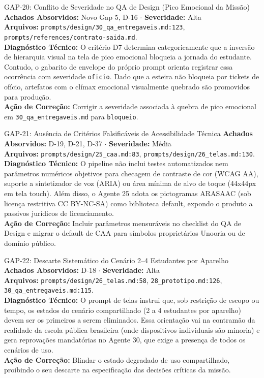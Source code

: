 \documentclass[11pt,a4paper]{article}
\begin{document}
\begin{gapbox}{GAP-20: Conflito de Severidade no QA de Design (Pico Emocional da Missão)}
\textbf{Achados Absorvidos:} Novo Gap 5, D-16 $\cdot$ \textbf{Severidade:} Alta\\
\textbf{Arquivos:} \texttt{prompts/design/30\_qa\_entregaveis.md:123}, \texttt{prompts/references/contrato-saida.md}.\\
\textbf{Diagnóstico Técnico:} O critério D7 determina categoricamente que a inversão de hierarquia visual na tela de pico emocional bloqueia a jornada do estudante. Contudo, o gabarito de envelope do próprio prompt orienta registrar essa ocorrência com severidade \texttt{oficio}. Dado que a esteira não bloqueia por tickets de ofício, artefatos com o clímax emocional visualmente quebrado são promovidos para produção.\\
\textbf{Ação de Correção:} Corrigir a severidade associada à quebra de pico emocional em \texttt{30\_qa\_entregaveis.md} para \texttt{bloqueio}.
\end{gapbox}

\begin{gapbox}{GAP-21: Ausência de Critérios Falsificáveis de Acessibilidade Técnica}
\textbf{Achados Absorvidos:} D-19, D-21, D-37 $\cdot$ \textbf{Severidade:} Média\\
\textbf{Arquivos:} \texttt{prompts/design/25\_caa.md:83}, \texttt{prompts/design/26\_telas.md:130}.\\
\textbf{Diagnóstico Técnico:} O pipeline não inclui testes automatizados nem parâmetros numéricos objetivos para checagem de contraste de cor (WCAG AA), suporte a sintetizador de voz (ARIA) ou área mínima de alvo de toque (44x44px em tela touch). Além disso, o Agente 25 adota os pictogramas ARASAAC (sob licença restritiva CC BY-NC-SA) como biblioteca default, expondo o produto a passivos jurídicos de licenciamento.\\
\textbf{Ação de Correção:} Incluir parâmetros mensuráveis no checklist do QA de Design e migrar o default de CAA para símbolos proprietários Unooria ou de domínio público.
\end{gapbox}

\begin{gapbox}{GAP-22: Descarte Sistemático do Cenário 2--4 Estudantes por Aparelho}
\textbf{Achados Absorvidos:} D-18 $\cdot$ \textbf{Severidade:} Alta\\
\textbf{Arquivos:} \texttt{prompts/design/26\_telas.md:58}, \texttt{28\_prototipo.md:126}, \texttt{30\_qa\_entregaveis.md:115}.\\
\textbf{Diagnóstico Técnico:} O prompt de telas instrui que, sob restrição de escopo ou tempo, os estados do cenário compartilhado (2 a 4 estudantes por aparelho) devem ser os primeiros a serem eliminados. Essa orientação vai na contramão da realidade da escola pública brasileira (onde dispositivos individuais são minoria) e gera reprovações mandatórias no Agente 30, que exige a presença de todos os cenários de uso.\\
\textbf{Ação de Correção:} Blindar o estado degradado de uso compartilhado, proibindo o seu descarte na especificação das decisões críticas da missão.
\end{gapbox}
\end{document}
